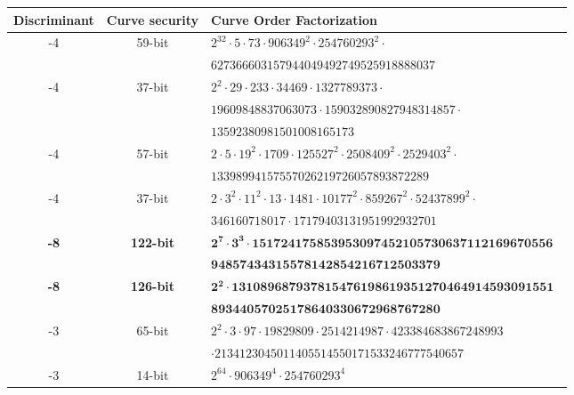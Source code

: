 \documentclass{amsart}
\begin{document}
\begin{table*}[ht]
    \centering\footnotesize
    \begin{tabularx}{\textwidth}{ccl}
        \toprule
                            
        \textbf{Discriminant}    & \textbf{Curve security}  & \textbf{Curve Order Factorization} \\
        \midrule        
        -4  &  59-bit & \tt $2^{32} \cdot 5 \cdot  73 \cdot 906349^{2} \cdot 254760293^{2} \cdot$ \\
                              	&   & \tt  $627366603157944049492749525918888037$ \\
        -4  &  37-bit & \tt $2^{2} \cdot 29 \cdot 233 \cdot 34469 \cdot 1327789373 \cdot$  \\
         			&   & \tt  $19609848837063073 \cdot 159032890827948314857 \cdot$  \\
                              	&   & \tt  $13592380981501008165173$ \\
        -4  &  57-bit & \tt $2 \cdot 5 \cdot 19^2 \cdot 1709 \cdot 125527^2 \cdot 2508409^2 \cdot 2529403^2 \cdot$ \\
                              	&   & \tt  $13398994157557026219726057893872289$ \\
        -4  &  37-bit & \tt $2\cdot 3^2 \cdot 11^2 \cdot 13 \cdot 1481 \cdot 10177^2 \cdot 859267^2 \cdot 52437899^2 \cdot$  \\
        &   & \tt   $346160718017 \cdot 17179403131951992932701$ \\
        \textbf{-8}  &   \textbf{122-bit} & \tt  $\mathbf{2^{7} \cdot 3^{3} \cdot 151724175853953097452105730637112169670556}$ \\
                              	&   & \tt    $\mathbf{94857434315578142854216712503379}$ \\
       	\textbf{-8} &   \textbf{126-bit} & \tt  $\mathbf{2^{2} \cdot 131089687937815476198619351270464914593091551}$  \\
                              	&   & \tt  $\mathbf{89344057025178640330672968767280}$ \\                              
        -3  &   65-bit & \tt $2^{2} \cdot 3 \cdot 97 \cdot 19829809 \cdot 2514214987 \cdot 423384683867248993$ \\
                              	&   & \tt  $\cdot 2134123045011405514550171533246777540657$  \\
        -3  &  14-bit & \tt $2^{64} \cdot 906349^{4} \cdot 254760293^{4}$  \\

\end{tabularx}
\end{table*}
\end{document}
